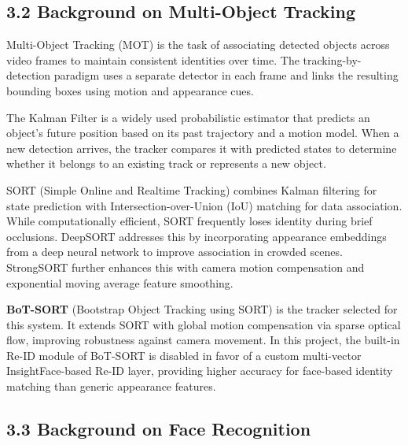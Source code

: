 \documentclass{report}
\begin{document}
\subsection*{3.2 Background on Multi-Object Tracking}

Multi-Object Tracking (MOT) is the task of associating detected objects across video frames to maintain\vspace{3pt} consistent identities over time. The tracking-by-detection paradigm uses a separate detector in each\vspace{3pt} frame and links the resulting bounding boxes using motion and appearance cues.

The Kalman Filter is a widely used probabilistic estimator that predicts an object's future position\vspace{3pt} based on its past trajectory and a motion model. When a new detection arrives, the tracker compares\vspace{3pt} it with predicted states to determine whether it belongs to an existing track or represents a new object.

SORT (Simple Online and Realtime Tracking) combines Kalman filtering for state prediction with\vspace{3pt} Intersection-over-Union (IoU) matching for data association. While computationally efficient, SORT\vspace{3pt} frequently loses identity during brief occlusions. DeepSORT addresses this by incorporating appearance\vspace{3pt} embeddings from a deep neural network to improve association in crowded scenes. StrongSORT further\vspace{3pt} enhances this with camera motion compensation and exponential moving average feature smoothing.

\textbf{BoT-SORT} (Bootstrap Object Tracking using SORT) is the tracker selected for this system. It extends\vspace{3pt} SORT with global motion compensation via sparse optical flow, improving robustness against camera\vspace{3pt} movement. In this project, the built-in Re-ID module of BoT-SORT is disabled in favor of a custom\vspace{3pt} multi-vector InsightFace-based Re-ID layer, providing higher accuracy for face-based identity matching\vspace{3pt} than generic appearance features.

\subsection*{3.3 Background on Face Recognition}
\end{document}
